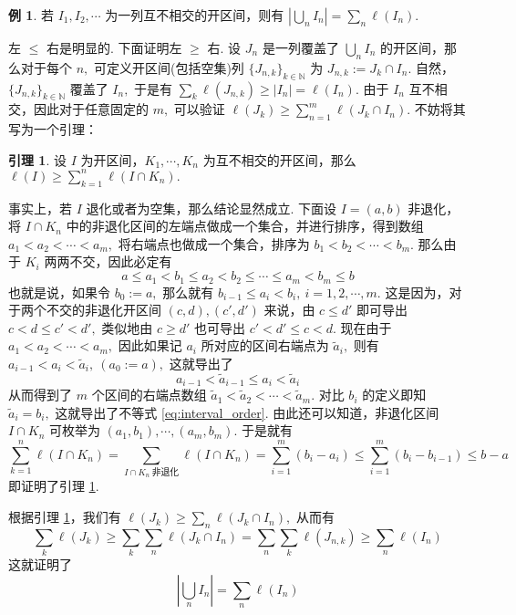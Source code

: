 \documentclass[12pt, a4paper, oneside]{book}
\numberwithin{figure}{section}
\theoremstyle{definition}
\newtheorem{lemma}[theorem]{引理}
\newtheorem{example}[theorem]{例}
\begin{document}
\begin{example}
    若 $I_1,I_2,\cdots$ 为一列互不相交的开区间，则有 $|\bigcup_n I_n|=\sum_n \ell(I_n).$
\end{example}
左 $\leq$ 右是明显的. 下面证明左 $\geq$ 右. 设 $J_n$ 是一列覆盖了 $\bigcup_n I_n$ 的开区间，那么对于每个 $n,$ 可定义开区间(包括空集)列 $\{J_{n,k}\}_{k\in\mathbb N}$ 为 $J_{n,k}:=J_k\cap I_n.$ 自然，$\{J_{n,k}\}_{k\in\mathbb N}$ 覆盖了 $I_n,$ 于是有 $\sum_k \ell(J_{n,k})\geq |I_n|= \ell(I_n).$
由于 $I_n$ 互不相交，因此对于任意固定的 $m,$ 可以验证 $\ell(J_k)\geq \sum_{n=1}^m \ell(J_k\cap I_n).$ 
不妨将其写为一个引理：
\begin{lemma}\label{lemma:disjoint_interval_intersection}
    设 $I$ 为开区间，$K_1,\cdots,K_n$ 为互不相交的开区间，那么 $\ell(I)\geq\sum_{k=1}^n \ell(I\cap K_n).$
\end{lemma}
事实上，若 $I$ 退化或者为空集，那么结论显然成立. 下面设 $I=(a,b)$ 非退化，将 $I\cap K_n$ 中的非退化区间的左端点做成一个集合，并进行排序，得到数组 $a_1<a_2<\cdots<a_m,$ 将右端点也做成一个集合，排序为 $b_1<b_2<\cdots<b_m.$ 那么由于 $K_i$ 两两不交，因此必定有 
\begin{equation}\label{eq:interval_order}
    a\leq a_1<b_1\leq a_2<b_2\leq\cdots\leq a_m<b_m\leq b
\end{equation}
也就是说，如果令 $b_0:=a,$ 那么就有 $b_{i-1}\leq a_i< b_{i},\ i=1,2,\cdots,m.$ 这是因为，对于两个不交的非退化开区间 $(c,d),(c',d')$ 来说，由 $c\leq d'$ 即可导出 $c<d\leq c'<d',$ 类似地由 $c\geq d'$ 也可导出 $c'<d'\leq c<d.$ 
现在由于 $a_1<a_2<\cdots<a_m,$ 因此如果记 $a_i$ 所对应的区间右端点为 $\tilde a_i,$ 则有 $a_{i-1}<a_{i}<\tilde a_{i},\ (a_0:=a),$ 这就导出了 
\begin{equation}
    a_{i-1}<\tilde a_{i-1}\leq a_i<\tilde a_i
\end{equation}
从而得到了 $m$ 个区间的右端点数组 $\tilde a_1<\tilde a_2<\cdots<\tilde a_m.$ 对比 $b_i$ 的定义即知 $\tilde a_i=b_i,$ 这就导出了不等式 \eqref{eq:interval_order}. 
由此还可以知道，非退化区间 $I\cap K_n$ 可枚举为 $(a_1,b_1),\cdots,(a_m,b_m).$ 于是就有 
\begin{equation}
    \sum_{k=1}^n \ell(I\cap K_n)=\sum_{I\cap K_n\ \text{非退化}} \ell(I\cap K_n)=\sum_{i=1}^m (b_i-a_i)\leq \sum_{i=1}^m (b_i-b_{i-1}) \leq b-a
\end{equation}
即证明了引理 \ref{lemma:disjoint_interval_intersection}. 

根据引理 \ref{lemma:disjoint_interval_intersection}，我们有 $\ell(J_k)\geq\sum_n \ell(J_k\cap I_n),$ 从而有 
\begin{equation}
    \sum_k \ell(J_k)\geq\sum_k\sum_n \ell(J_k\cap I_n)=\sum_{n}\sum_k \ell(J_{n,k}) \geq \sum_n\ell(I_n)
\end{equation}
这就证明了
\begin{equation}
    \left|\bigcup_n I_n\right|=\sum_n\ell(I_n)
\end{equation}
\end{document}
